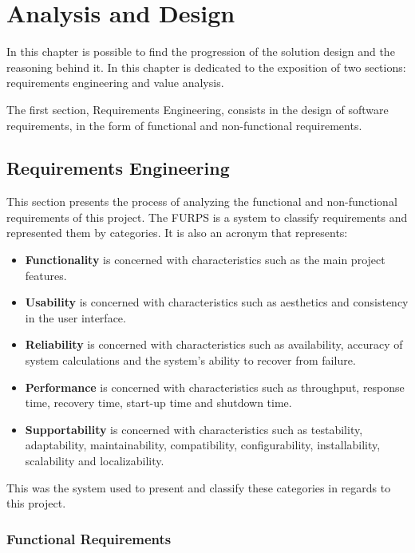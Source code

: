 
\chapter{Analysis and Design} %
\label{chap:Chapter4}

In this chapter is possible to find the progression of the solution design and the reasoning behind it.
In this chapter is dedicated to the exposition of two sections: requirements engineering and value analysis.

The first section, Requirements Engineering, consists in the design of software requirements, in the form of functional and non-functional requirements.

\section{Requirements Engineering}

This section presents the process of analyzing the functional and non-functional requirements of this project.
The FURPS\cite{eeles2005capturing} is a system to classify requirements and represented them by categories.
It is also an acronym that represents:

\begin{itemize}
    \item \textbf{Functionality} is concerned with characteristics such as the main project features.
    \item \textbf{Usability} is concerned with characteristics such as aesthetics and consistency in the user interface.
    \item \textbf{Reliability} is concerned with characteristics such as availability, accuracy of system calculations and the system's ability to recover from failure.
    \item \textbf{Performance} is concerned with characteristics such as throughput, response time, recovery time, start-up time and shutdown time.
    \item \textbf{Supportability} is concerned with characteristics such as testability, adaptability, maintainability, compatibility, configurability, installability, scalability and localizability.
\end{itemize}

This was the system used to present and classify these categories in regards to this project.

\subsection{Functional Requirements}


